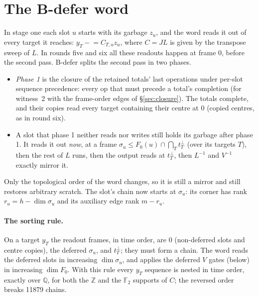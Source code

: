 \documentclass[11pt]{article}
\theoremstyle{remark}\newtheorem*{remark}{Remark}
\begin{document}
\section{The B-defer word}
In stage one each slot $u$ starts with its garbage $z_u$, and the word reads it out of every target it reaches:
$y_T\mathrel{-}=C_{T,u}z_u$, where $C=JL$ is given by the transpose sweep of $L$. In rounds five and six all these
readouts happen at frame $0$, before the second pass. B-defer splits the second pass in two phases.

\begin{itemize}
\item \emph{Phase 1} is the closure of the retained totals' last operations under per-slot sequence precedence: every
  op that must precede a total's completion (for witness~2 with the frame-order edges of \S\ref{sec:closure}). The totals complete, and their copies read every target containing
  their centre at $0$ (copied centres, as in round six).
\item A slot that phase 1 neither reads nor writes still holds its garbage after phase 1. It reads it out
  \emph{now}, at a frame $\sigma_u\le F_0(u)\cap\bigcap_{T}t_T^\perp$ (over its targets $T$), then the rest of $L$ runs,
  then the output reads at $t_T^\perp$, then $L^{-1}$ and $V^{-1}$ exactly mirror it.
\end{itemize}
Only the topological order of the word changes, so it is still a mirror and still restores arbitrary scratch. The
slot's chain now starts at $\sigma_u$: its corner has rank $r_u=h-\dim\sigma_u$ and its auxiliary edge rank $m-r_u$.

\paragraph{The sorting rule.} On a target $y_T$ the readout frames, in time order, are $0$ (non-deferred slots and
centre copies), the deferred $\sigma_u$, and $t_T^\perp$; they must form a chain. The word reads the deferred slots
in increasing $\dim\sigma_u$, and applies the deferred $V$ gates (below) in increasing $\dim F_0$. With this rule
every $y_T$ sequence is nested in time order, exactly over $\mathbb Q$, for both the $\mathbb Z$ and the
$\mathbb F_2$ supports of $C$; the reversed order breaks 11879 chains.
\end{document}
